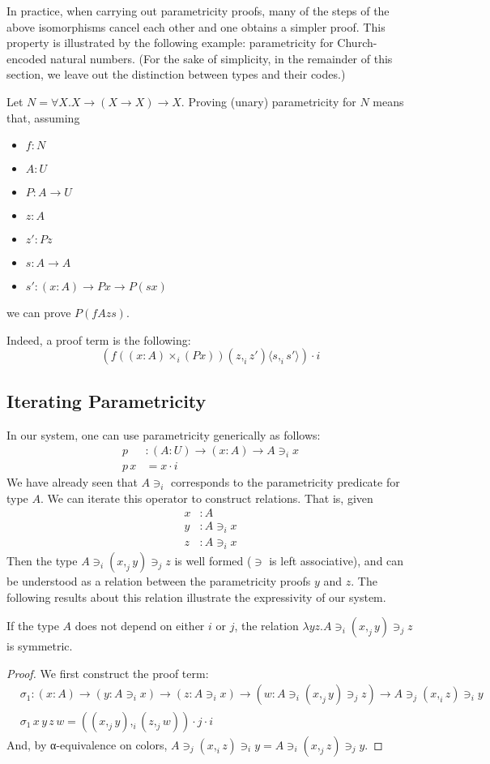 \documentclass[english]{PaperTools/latex/lipics}
\newcommand\CP[3]{(#2,_{#1} #3)}
\newcommand\CTimes[2]{(#2) ×_{#1}}
\newcommand\param[1]{\!\cdot\!#1}
\newcommand\op[1]{∋_{#1}}
\newcommand\fp[3]{⟨#2 ,_{#1} #3⟩}
\begin{document}
In practice, when carrying out parametricity proofs, many of the steps
of the above isomorphisms cancel each other and one obtains a simpler
proof. This property is illustrated by the following example:
parametricity for Church-encoded natural numbers.
(For the sake of simplicity, in the remainder of this section, we leave out the
distinction between types and their codes.)
\begin{example}
Let $N = ∀X. X → (X → X) → X$.
Proving (unary) parametricity for $N$ means that, assuming
\begin{itemize}
\item $f : N$
\item $A : U$
\item $P : A → U$
\item $z : A$
\item $z' : P z$
\item $s : A → A$
\item $s' : (x:A) → P x → P (s x)$
\end{itemize}
we can prove $P (f A z s)$.

Indeed, a proof term is the following:
%
\[
(f (\CTimes i {x:A} (P x)) \CP i z {z'} \fp i s {s'}) \param i
\]
\end{example}

\subsection{Iterating Parametricity}
In our system, one can use parametricity generically as follows:
\begin{align*}
p &: (A:U) → (x:A) → A \op i x\\
p\, x &= x\param i
\end{align*}
We have already seen that $A \op i $ corresponds to the parametricity
predicate for type $A$. We can iterate this operator to construct
relations. That is, given
\begin{align*}
  x & :A \\
  y & : A \op i x\\
  z & : A \op i x
\end{align*}
Then the type $A \op i \CP j x y \op j z$ is well formed ($∋$ is left
associative), and can be understood as a relation
between the parametricity proofs $y$ and $z$. The following results about this relation illustrate the expressivity of our system.
\begin{theorem}
If the type $A$ does not depend on either $i$ or $j$, the relation $λy z. A \op i \CP j x y \op j z$ is symmetric.
\end{theorem}
\begin{proof}
  We first construct the proof term:
  \begin{align*}
    &\sigma_1 : (x:A) → (y : A \op i x) → (z : A \op i x) → (w : A \op i \CP j x y \op j z) → A \op j \CP i x z \op i y \\
    &\sigma_1\, x\, y\, z\, w = \CP i {\CP j x y}{\CP j z w} \param j \param i
  \end{align*}
  And, by α-equivalence on colors, $A \op j \CP i x z \op i y = A \op i \CP j x z \op j y$.
\end{proof}
\end{document}
